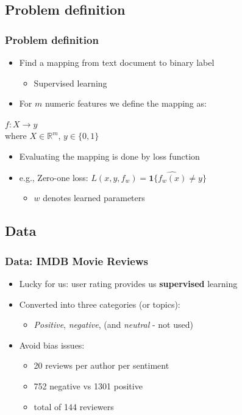 \documentclass{beamer}
\begin{document}
\subsection{Problem definition}
\begin{frame}
	\frametitle{Problem definition}
	\begin{itemize}
		\item Find a mapping from text document to binary label \pause
		\begin{itemize}
			\item Supervised learning
		\end{itemize} \pause
		\item For $m$ numeric features we define the mapping as:
	\end{itemize}
	\pause
	\begin{definition}
		\center
		$f: X \to y$ \\
		where $X \in \mathbb{R}^{m}$, $y \in \{0,1\}$
	\end{definition}
	\pause
	\begin{itemize}
		\item Evaluating the mapping is done by loss function \pause
		\item e.g., Zero-one loss: $L(x,y,f_w)=\textbf{1}\{ \hat{f_w(x)} \neq y \}$
		\begin{itemize}
			\item $w$ denotes learned parameters
		\end{itemize}
	\end{itemize}
\end{frame}

\subsection{Data}

\begin{frame}
	\frametitle{Data: IMDB Movie Reviews}
	\begin{itemize}
		\item Lucky for us: user rating provides us \textbf{supervised} learning
		\item Converted into three categories (or topics):
		\begin{itemize}
			\item \emph{Positive}, \emph{negative}, (and \emph{neutral} - not used)
		\end{itemize}
		\item Avoid bias issues:
		\begin{itemize}
			\item 20 reviews per author per sentiment
			\item 752 negative vs 1301 positive
			\item total of 144 reviewers
		\end{itemize}
	\end{itemize}
\end{frame}
\end{document}
